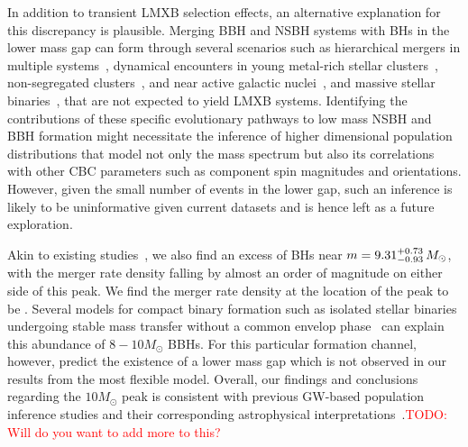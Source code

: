 \documentclass[modern]{aastex631}
\newcommand{\todo}[1]{\textcolor{red}{TODO: #1}}
\begin{document}
In addition to transient LMXB selection effects, an alternative explanation for this discrepancy is plausible. Merging BBH and NSBH systems with BHs in the lower mass gap can form through several scenarios such as hierarchical mergers in multiple systems~\citep{Lu:2020gfh, Liu:2020gif}, dynamical encounters in young metal-rich stellar clusters~\citep{ArcaSedda:2021zmm}, non-segregated clusters~\citep{Clausen:2014ksa, Fragione:2020wac, Rastello:2020sru}, and near active galactic nuclei~\citep{McKernan:2020lgr, Yang:2020xyi}, and massive stellar binaries~\citep{Antoniadis:2021dhe}, that are not expected to yield LMXB systems. Identifying the contributions of these specific evolutionary pathways to low mass NSBH and BBH formation might necessitate the inference of higher dimensional population distributions that model not only the mass spectrum but also its correlations with other CBC parameters such as component spin magnitudes and orientations. However, given the small number of events in the lower gap, such an inference is likely to be uninformative given current datasets and is hence left as a future exploration.

Akin to existing studies~\citep[e.g.,][]{KAGRA:2021duu}, we also find an excess of BHs near $m=9.31^{+0.73}_{-0.93} \, M_\odot$, with the merger rate density falling by almost an order of magnitude on either side of this peak. We find the merger rate density at the location of the peak to be \dNlogmpeakincludingnewunits. Several models for compact binary formation such as isolated stellar binaries undergoing stable mass transfer without a common envelop phase~\citep{vanSon:2022myr} can explain this abundance of $8-10M_{\odot}$ BBHs. For this particular formation channel, however, \cite{vanSon:2022myr} predict the existence of a lower mass gap which is not observed in our results from the most flexible model. Overall, our findings and conclusions regarding the $10M_{\odot}$ peak is consistent with previous GW-based population inference studies and their corresponding astrophysical interpretations~\citep[see, e.g., ][and references therein]{KAGRA:2021duu, vanSon:2022myr}.\todo{Will do you want to add more to this?}
\end{document}

